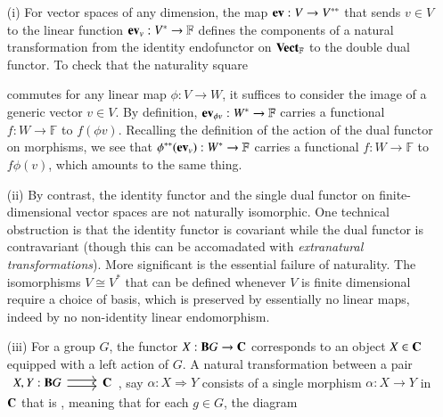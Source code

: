 \documentclass[12pt, a4paper, oneside, openright, titlepage]{book}
\begin{document}
\begin{eg}
    \leavevmode
    \begin{enumerate}
        \item[(i)] For vector spaces of any dimension, the map $\operatorname{\bf{ev}}:V\rightarrow V^{**}$ that sends $v \in V$ to the linear function $\operatorname{\bf{ev}}_v:V^*\rightarrow \mathbb{F}$ defines the components of a natural transformation from the identity endofunctor on $\normalfont\textbf{Vect}_{\mathbb{F}}$ to the double dual functor. To check that the naturality square 
        \begin{center}
        \end{center}
            commutes for any linear map $\phi:V\rightarrow W$, it suffices to consider the image of a generic vector $v \in V$. By definition, $\operatorname{\bf{ev}}_{\phi v}:W^*\rightarrow \mathbb{F}$ carries a functional $f:W\rightarrow \mathbb{F}$ to $f(\phi v)$. Recalling the definition of the action of the dual functor on morphisms, we see that $\phi^{**}(\operatorname{\bf{ev}}_v):W^*\rightarrow \mathbb{F}$ carries a functional $f:W\rightarrow \mathbb{F}$ to $f\phi(v)$, which amounts to the same thing.
        \item[(ii)] By contrast, the identity functor and the single dual functor on finite-dimensional vector spaces are not naturally isomorphic. One technical obstruction is that the identity functor is covariant while the dual functor is contravariant (though this can be accomadated with \emph{extranatural transformations}). More significant is the essential failure of naturality. The isomorphisms $V\cong V^*$ that can be defined whenever $V$ is finite dimensional require a choice of basis, which is preserved by essentially no linear maps, indeed by no non-identity linear endomorphism.
        \item[(iii)] For a group $G$, the functor $X:\normalfont\textbf{B}G\rightarrow \normalfont\textbf{C}$ corresponds to an object $X \in \normalfont\textbf{C}$ equipped with a left action of $G$. A natural transformation between a pair $\begin{tikzcd} {X,Y:\mathbf{B}G} & {\mathbf{C}} \arrow[shift right=1, from=1-1, to=1-2] \arrow[shift left=1, from=1-1, to=1-2] \end{tikzcd}$, say $\alpha:X\Rightarrow Y$ consists of a single morphism $\alpha:X\rightarrow Y$ in $\normalfont\textbf{C}$ that is , meaning that for each $g \in G$, the diagram

\end{enumerate}
\end{eg}
\end{document}
